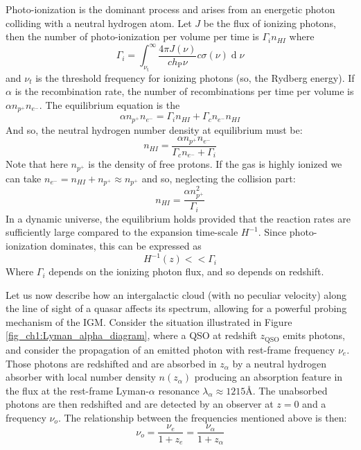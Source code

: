 Photo-ionization is the dominant process and arises from an energetic photon colliding with a neutral hydrogen atom. Let $J$ be the flux of ionizing photons, then the number of photo-ionization per volume per time is $\Gamma_i n_{HI}$ where 
\begin{equation}
    \Gamma_i=\int_{\nu_\mathrm{t}}^\infty\frac{4\pi J(\nu)}{ch_\mathrm{P}\nu}c\sigma(\nu)\operatorname{d}\nu
\end{equation}
and $\nu_t$ is the threshold frequency for ionizing photons (so, the Rydberg energy). If $\alpha$ is the recombination rate, the number of recombinations per time per volume is $\alpha n_{p^+}n_{e^-}$.
The equilibrium equation is the
\begin{equation}
    \alpha n_{p^+}n_{e^-}=\Gamma_i n_{HI}+\Gamma_cn_{e^-}n_{HI}  
\end{equation}
And so, the neutral hydrogen number density at equilibrium must be:
\begin{equation}
    n_{HI}=\frac{\alpha n_{p^+}n_{e^-}}{\Gamma_c n_{e^-}+\Gamma_i}
\end{equation}
Note that here $n_{p^+}$ is the density of free protons. If the gas is highly ionized we can take $n_{e^-}=n_{HI}+n_{p^+}\approx n_{p^+}$ and so, neglecting the collision part:
\begin{equation}
    n_{HI}=\frac{\alpha n_{p^+}^2}{\Gamma_i}
\end{equation}
In a dynamic universe, the equilibrium holds provided that the reaction rates are sufficiently large compared to the expansion time-scale $H^{-1}$. Since photo-ionization dominates, this can be expressed as 
\begin{equation}
    H^{-1}(z)<< \Gamma_i
\end{equation}
Where $\Gamma_i$ depends on the ionizing photon flux, and so depends on redshift.














Let us now describe how an intergalactic cloud (with no peculiar velocity) along the line of sight of a quasar affects its spectrum, allowing for a powerful probing mechanism of the IGM. Consider the situation illustrated in Figure \ref{fig_ch1:Lyman_alpha_diagram}, where a QSO at redshift $z_\text{QSO}$ emits photons, and consider the propagation of an emitted photon with rest-frame frequency $\nu_e$. Those photons are redshifted and are absorbed in $z_\alpha$ by a neutral hydrogen absorber with local number density $n(z_\alpha)$ producing an absorption feature in the flux at the rest-frame Lyman-$\alpha$ resonance $\lambda_\alpha \approx 1215$\r{A}. The unabsorbed photons are then redshifted and are detected by an observer at $z=0$ and a frequency $\nu_o$. The relationship between the frequencies mentioned above is then:
\begin{equation}
    \nu_o=\frac{\nu_e}{1+z_e}=\frac{\nu_\alpha}{1+z_\alpha} 
\end{equation}

